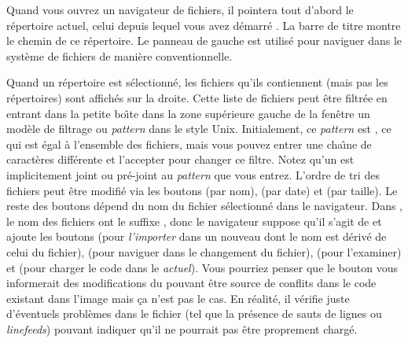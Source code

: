 \documentclass[a4paper,10pt,twoside]{book}
\begin{document}
Quand vous ouvrez un navigateur de fichiers, il pointera tout d'abord le r\'epertoire
actuel, \ie celui depuis lequel vous avez d\'emarr\'e \sq. La barre de titre
montre le chemin de ce r\'epertoire.
Le panneau de gauche est utilis\'e pour naviguer dans le syst\`eme de fichiers de mani\`ere
conventionnelle.

Quand un r\'epertoire est s\'electionn\'e, les fichiers qu'ils contiennent (mais pas les r\'epertoires) sont affich\'es sur la droite.
Cette liste de fichiers peut \^etre filtr\'ee en entrant dans la petite bo\^{\i}te
dans la zone sup\'erieure gauche de la fen\^etre un mod\`ele de filtrage ou 
\emph{pattern} dans le style Unix.
Initialement, ce \emph{pattern} est \ct{*}, ce qui est \'egal \`a l'ensemble des fichiers, mais vous pouvez entrer une cha\^{\i}ne de caract\`eres diff\'erente et l'accepter pour changer ce filtre. 
Notez qu'un \ct{*} est implicitement joint ou pr\'e-joint au \emph{pattern}
que vous entrez.
L'ordre de tri des fichiers peut \^etre modifi\'e via les boutons  (par nom),  (par date) et  (par taille).
Le reste des boutons d\'epend du nom du fichier s\'electionn\'e dans le navigateur.
Dans , le nom des fichiers ont le suffixe , donc le navigateur
suppose qu'il s'agit de \changeset et ajoute les boutons  (pour
\textit{l'importer} dans un nouveau \changeset dont le nom est d\'eriv\'e
de celui du fichier),  (pour naviguer dans le changement du fichier),
 (pour l'examiner) et  (pour charger
le code dans le \changeset \emph{actuel}).
Vous pourriez penser que le bouton  vous informerait 
des modifications du \changeset pouvant \^etre source de conflits dans le code existant
dans l'image mais \c{c}a n'est pas le cas.
En r\'ealit\'e, il v\'erifie juste d'\'eventuels probl\`emes dans le fichier (tel que
la pr\'esence de sauts de lignes ou \textit{linefeeds})
pouvant indiquer qu'il ne pourrait pas \^etre proprement charg\'e.
\end{document}
